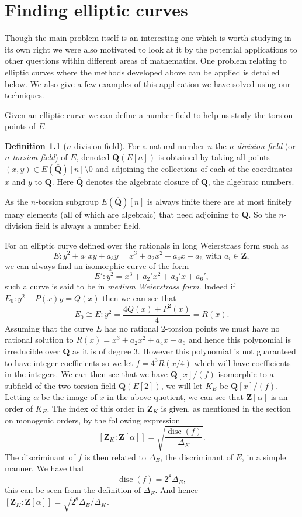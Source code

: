\documentclass[12pt,a4paper,abstracton,bibtotoc]{scrreprt}
\theoremstyle{definition}
\newtheorem{defn}{Definition}
\newcommand{\QQ}{\mathbf{Q}}
\newcommand{\ZZ}{\mathbf{Z}}
\DeclareMathOperator{\disc}{disc}
\begin{document}
\chapter{Finding elliptic curves}
\label{chap:ellapp}
Though the main problem itself is an interesting one which is worth studying in its own right we were also motivated to look at it by the potential applications to other questions within different areas of mathematics.
One problem relating to elliptic curves where the methods developed above can be applied is detailed below.
We also give a few examples of this application we have solved using our techniques.

Given an elliptic curve we can define a number field to help us study the torsion points of $E$.

\begin{defn}[$n$-division field]
For a natural number $n$ the \emph{$n$-division field} (or \emph{$n$-torsion field}) of $E$, denoted $\QQ(E[n])$ is obtained by taking all points $(x,y) \in E(\overline{\QQ})[n]\setminus 0$ and adjoining the collections of each of the coordinates $x$ and $y$ to $\QQ$.
Here $\overline{\QQ}$ denotes the algebraic closure of $\QQ$, the algebraic numbers.
\end{defn}
As the $n$-torsion subgroup $E(\overline{\QQ})[n]$ is always finite there are at most finitely many elements (all of which are algebraic) that need adjoining to $\QQ$.
So the $n$-division field is always a number field.

\minisec{}

For an elliptic curve defined over the rationals in long Weierstrass form such as
\[
E \colon y^2 + a_1xy + a_3y = x^3 + a_2x^2 + a_4x + a_6\text{ with }a_i \in \ZZ,
\]
we can always find an isomorphic curve of the form
\[
E' \colon y^2 = x^3 + a_2'x^2 + a_4'x + a_6',
\]
such a curve is said to be in \emph{medium Weierstrass form}.
Indeed if $E_0\colon y^2 + P(x)y  = Q(x)$ then we can see that
\[
E_0\cong E \colon y^2 = \frac{4Q(x) + P^2(x)}{4} = R(x).
\]
Assuming that the curve $E$ has no rational 2-torsion points we must have no rational solution to $R(x) = x^3 + a_2x^2 + a_4x + a_6$ and hence this polynomial is irreducible over $\QQ$ as it is of degree 3.
However this polynomial is not guaranteed to have integer coefficients so we let $f = 4^3 R(x/4)$ which will have coefficients in the integers.
We can then see that we have $\QQ[x]/(f)$ isomorphic to a subfield of the two torsion field $\QQ(E[2])$, we will let $K_E$ be $\QQ[x]/(f)$.
Letting $\alpha$ be the image of $x$ in the above quotient, we can see that $\ZZ[\alpha]$ is an order of $K_E$.
The index of this order in $\ZZ_K$ is given, as mentioned in the section on monogenic orders, by the following expression
\[
[\ZZ_K:\ZZ[\alpha]] = \sqrt{\frac{\disc(f)}{\Delta_K}}.
\]
The discriminant of $f$ is then related to $\Delta_E$, the discriminant of $E$, in a simple manner.
We have that
\[
\disc(f) = 2^8 \Delta_E,
\]
this can be seen from the definition of $\Delta_E$.
And hence $[\ZZ_K:\ZZ[\alpha]] = \sqrt{2^8\Delta_E/\Delta_K}$.
\end{document}
